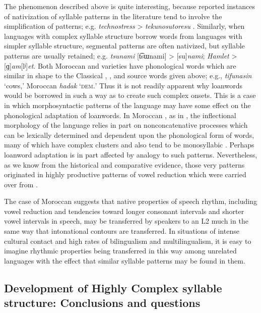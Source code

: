   The phenomenon described above is quite interesting, because reported instances of nativization of syllable patterns in the literature tend to involve the simplification of patterns; e.g.  \textit{technostress} >  \textit{tekunosutoresu} \citep[69]{Kay1995}. Similarly, when languages with complex syllable structure borrow words from languages with simpler syllable structure, segmental patterns are often nativized, but syllable patterns are usually retained; e.g.  \textit{tsunami} [t͡sɯnami] >  [su]\textit{nami};  \textit{Hamlet} >  [ɡ]\textit{am}[lʲ]\textit{et}. Both Moroccan  and  varieties have phonological words which are similar in shape to the Classical , , and  source words given above; e.g.,  \textit{tifunasin} ‘cows,’ Moroccan  \textit{hadak} ‘\textsc{dem.}’ Thus it is not readily apparent why loanwords would be borrowed in such a way as to create such complex onsets. This is a case in which morphosyntactic patterns of the language may have some effect on the phonological adaptation of loanwords. In Moroccan , as in , the inflectional morphology of the language relies in part on nonconcatenative processes which can be lexically determined and dependent upon the phonological form of words, many of which have complex clusters and also tend to be monosyllabic \citep{Heath2007}. Perhaps loanword adaptation is in part affected by analogy to such patterns. Nevertheless, as we know from the historical and comparative evidence, those very patterns originated in highly productive patterns of vowel reduction which were carried over from .

  The case of Moroccan  suggests that native properties of speech rhythm, including vowel reduction and tendencies toward longer consonant intervals and shorter vowel intervals in speech, may be transferred by speakers to an L2 much in the same way that intonational contours are transferred. In situations of intense cultural contact and high rates of bilingualism and multilingualism, it is easy to imagine rhythmic properties being transferred in this way among unrelated languages with the effect that similar syllable patterns may be found in them.

\subsection{Development of Highly Complex syllable structure: Conclusions and questions}\label{sec:8.4.6}

